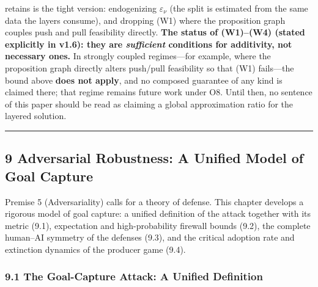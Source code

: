 \documentclass[
  11pt]{article}
\begin{document}
retains is the tight version: endogenizing \(\varepsilon_\nu\) (the
split is estimated from the same data the layers consume), and dropping
(W1) where the proposition graph couples push and pull feasibility
directly. \textbf{The status of (W1)--(W4) (stated explicitly in v1.6):
they are \emph{sufficient} conditions for additivity, not necessary
ones.} In strongly coupled regimes---for example, where the proposition
graph directly alters push/pull feasibility so that (W1) fails---the
bound above \textbf{does not apply}, and no composed guarantee of any
kind is claimed there; that regime remains future work under O8. Until
then, no sentence of this paper should be read as claiming a global
approximation ratio for the layered solution.

\begin{center}\rule{0.5\linewidth}{0.5pt}\end{center}

\subsection{9 Adversarial Robustness: A Unified Model of Goal
Capture}\label{adversarial-robustness-a-unified-model-of-goal-capture}

Premise 5 (Adversariality) calls for a theory of defense. This chapter
develops a rigorous model of goal capture: a unified definition of the
attack together with its metric (9.1), expectation and high-probability
firewall bounds (9.2), the complete human--AI symmetry of the defenses
(9.3), and the critical adoption rate and extinction dynamics of the
producer game (9.4).

\subsubsection{9.1 The Goal-Capture Attack: A Unified
Definition}\label{the-goal-capture-attack-a-unified-definition}
\end{document}
